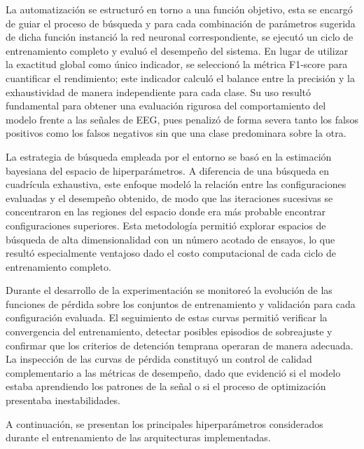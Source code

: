 La automatización se estructuró en torno a una función objetivo, esta se encargó de guiar el proceso de búsqueda y para cada combinación de parámetros sugerida de dicha función instanció la red neuronal correspondiente, se ejecutó un ciclo de entrenamiento completo y evaluó el desempeño del sistema. En lugar de utilizar la exactitud global como único indicador, se seleccionó la métrica F1-score para cuantificar el rendimiento; este indicador calculó el balance entre la precisión y la exhaustividad de manera independiente para cada clase. Su uso resultó fundamental para obtener una evaluación rigurosa del comportamiento del modelo frente a las señales de EEG, pues penalizó de forma severa tanto los falsos positivos como los falsos negativos sin que una clase predominara sobre la otra.

La estrategia de búsqueda empleada por el entorno se basó en la estimación bayesiana del espacio de hiperparámetros. A diferencia de una búsqueda en cuadrícula exhaustiva, este enfoque modeló la relación entre las configuraciones evaluadas y el desempeño obtenido, de modo que las iteraciones sucesivas se concentraron en las regiones del espacio donde era más probable encontrar configuraciones superiores. Esta metodología permitió explorar espacios de búsqueda de alta dimensionalidad con un número acotado de ensayos, lo que resultó especialmente ventajoso dado el costo computacional de cada ciclo de entrenamiento completo.

Durante el desarrollo de la experimentación se monitoreó la evolución de las funciones de pérdida sobre los conjuntos de entrenamiento y validación para cada configuración evaluada. El seguimiento de estas curvas permitió verificar la convergencia del entrenamiento, detectar posibles episodios de sobreajuste y confirmar que los criterios de detención temprana operaran de manera adecuada. La inspección de las curvas de pérdida constituyó un control de calidad complementario a las métricas de desempeño, dado que evidenció si el modelo estaba aprendiendo los patrones de la señal o si el proceso de optimización presentaba inestabilidades.


A continuación, se presentan los principales hiperparámetros considerados durante el entrenamiento de las arquitecturas implementadas.

